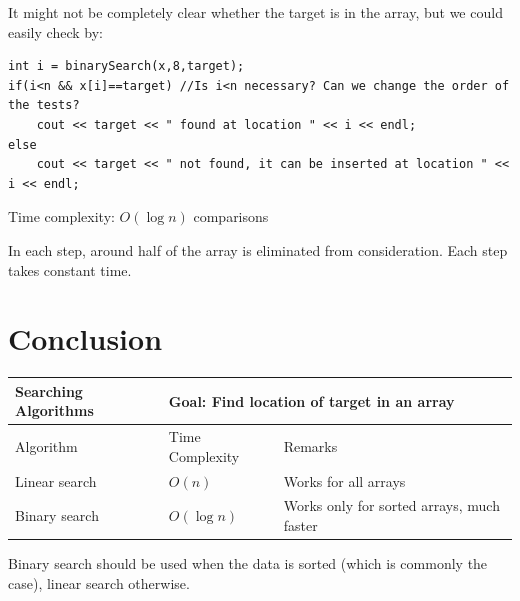 It might not be completely clear whether the target is in the array, but we could easily check by:

\begin{lstlisting}
int i = binarySearch(x,8,target);
if(i<n && x[i]==target) //Is i<n necessary? Can we change the order of the tests?
    cout << target << " found at location " << i << endl;
else 
    cout << target << " not found, it can be inserted at location " << i << endl;
\end{lstlisting}

Time complexity: $O(\log n)$ comparisons
\vspace{6mm}

In each step, around half of the array is eliminated from consideration. Each step takes constant time.

\section{Conclusion}

\begin{table}[h]
    \centering
    \begin{tabular}{|m{6em}|m{9em}|m{18em}|}
        \hline  
        \textbf{Searching Algorithms} & 
        \multicolumn{2}{l|}{Goal: Find location of target in an array}
        \\ \hline \hline
        
        Algorithm &
        Time Complexity & 
        Remarks
        \\ \hline \hline
        
        Linear search &
        $O(n)$ &
        Works for all arrays
        \\ \hline
        
        Binary search &
        $O(\log n)$ &
        Works only for sorted arrays, much faster
        \\ \hline
    \end{tabular}
\end{table}

Binary search should be used when the data is sorted (which is commonly the case), linear search otherwise.
